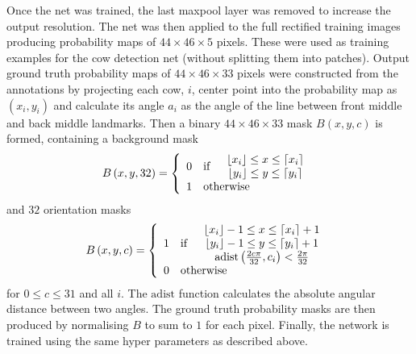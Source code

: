 \documentclass[10pt,a4paper,twocolumn]{article}
\begin{document}
Once the net was trained, the last maxpool layer was removed to increase the output resolution. The net was then applied to the full rectified training images producing probability maps of $44\times 46\times 5$ pixels. These were used as training examples for the cow detection net (without splitting them into patches). Output ground truth probability maps of $44\times 46\times 33$ pixels were constructed from the annotations by projecting each cow, $i$, center point into the probability map as $\left( x_i, y_i \right)$ and calculate its angle $a_i$ as the angle of the line between front middle and back middle landmarks. Then a binary $44\times 46\times 33$ mask $B\left( x, y, c \right)$ is formed, containing a background mask
\begin{equation}
B\left( x, y, 32 \right) = \left\lbrace
\begin{array}{clc}
0 & \text{if} &
\begin{array}{c}
 \lfloor x_i \rfloor \leq x \leq \lceil x_i \rceil \\
 \lfloor y_i \rfloor \leq y \leq \lceil y_i \rceil
\end{array}
\\
1 & \multicolumn{2}{l}{\text{otherwise}}
\end{array}
\right.
\end{equation}
and $32$ orientation masks
\begin{equation}
B\left( x, y, c \right) = \left\lbrace
\begin{array}{clc}
1 & \text{if} &
\begin{array}{c}
 \lfloor x_i \rfloor-1 \leq x \leq \lceil x_i \rceil+1 \\
 \lfloor y_i \rfloor-1 \leq y \leq \lceil y_i \rceil+1 \\
 \mathrm{adist}\left(\frac{2c\pi}{32}, c_i\right) < \frac{2\pi}{32} \\
\end{array}
\\
0 & \multicolumn{2}{l}{\text{otherwise}}
\end{array}
\right.
\end{equation}
for $0\leq c \leq 31$ and all $i$. The $\mathrm{adist}$ function calculates the absolute angular distance between two angles. The ground truth probability masks are then produced by normalising $B$ to sum to $1$ for each pixel. Finally, the network is trained using the same hyper parameters as described above.
\end{document}

